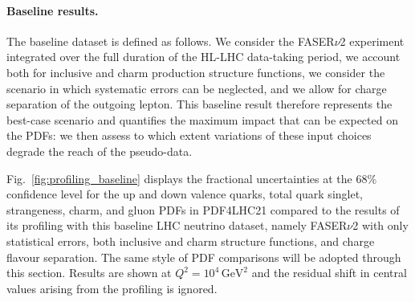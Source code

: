 \paragraph{Baseline results.}
%
The baseline dataset is defined as follows.
%
We consider the FASER$\nu$2 experiment integrated over the full duration of the HL-LHC data-taking period,
we account both for inclusive and charm production structure functions, we consider the scenario
in which systematic errors can be neglected, and we allow for charge separation of the outgoing lepton.
%
This baseline result therefore represents the best-case scenario and quantifies the maximum impact that can be expected
on the PDFs: we then assess to which extent variations of these input choices degrade the reach of the pseudo-data.

Fig.~\ref{fig:profiling_baseline} displays the fractional uncertainties at the 68\% confidence level
for the up and down valence quarks, total quark singlet, strangeness, charm, and gluon PDFs
in PDF4LHC21 compared to the results of its profiling with this baseline LHC neutrino dataset, namely
FASER$\nu$2 with only statistical errors, both inclusive and charm structure functions,  and charge flavour
separation.
%
The same style of PDF comparisons will be adopted through this section.
%
Results are shown at $Q^2 = 10^4 \, \textrm{GeV}^2$ and the residual shift in central values
arising from the profiling is ignored.

